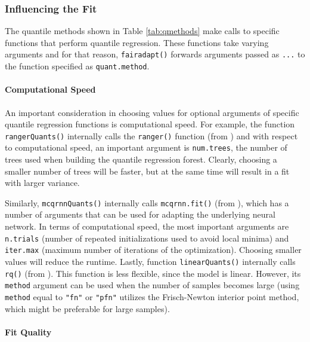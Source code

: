 \documentclass[
  nojss]{jss}
\begin{document}
\hypertarget{influencing-the-fit}{%
\subsubsection{Influencing the Fit}\label{influencing-the-fit}}

The quantile methods shown in Table \ref{tab:qmethods} make calls to
specific functions that perform quantile regression. These functions
take varying arguments and for that reason, \texttt{fairadapt()}
forwards arguments passed as \texttt{...} to the function specified as
\texttt{quant.method}.

\hypertarget{computational-speed}{%
\paragraph{Computational Speed}\label{computational-speed}}

An important consideration in choosing values for optional arguments of
specific quantile regression functions is computational speed. For
example, the function \texttt{rangerQuants()} internally calls the
\texttt{ranger()} function (from ) and with respect to
computational speed, an important argument is \texttt{num.trees}, the
number of trees used when building the quantile regression forest.
Clearly, choosing a smaller number of trees will be faster, but at the
same time will result in a fit with larger variance.

Similarly, \texttt{mcqrnnQuants()} internally calls
\texttt{mcqrnn.fit()} (from ), which has a number of arguments
that can be used for adapting the underlying neural network. In terms of
computational speed, the most important arguments are \texttt{n.trials}
(number of repeated initializations used to avoid local minima) and
\texttt{iter.max} (maximum number of iterations of the optimization).
Choosing smaller values will reduce the runtime. Lastly, function
\texttt{linearQuants()} internally calls \texttt{rq()} (from
). This function is less flexible, since the model is
linear. However, its \texttt{method} argument can be used when the
number of samples becomes large (using \texttt{method} equal to
\texttt{"fn"} or \texttt{"pfn"} utilizes the Frisch-Newton interior
point method, which might be preferable for large samples).

\hypertarget{fit-quality}{%
\paragraph{Fit Quality}\label{fit-quality}}
\end{document}

